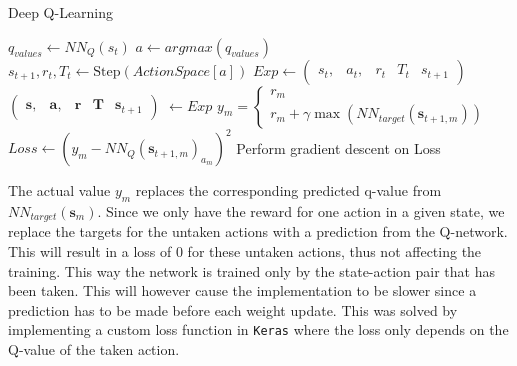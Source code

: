 \documentclass{LTHtwocol} %
\begin{document}
\begin{algorithm}[H]
	\label{alg:deep_q_training}
	\caption{Deep Q-Learning}
	\begin{algorithmic}
			 
				\State $q_{values} \gets NN_Q(s_t)$  %
				\State $a \gets argmax(q_{values})$ 	 
				\State $s_{t+1}, r_t, T_t \gets \text{Step}(ActionSpace[a])$ %
				\State $Exp \gets \begin{pmatrix} s_t, & a_t, & r_t & T_t & s_{t+1} \end{pmatrix}$
				\State $\begin{pmatrix} \mathbf{s}, & \mathbf{a}, & \mathbf{r} & \mathbf{T} & \mathbf{s}_{t+1} \end{pmatrix}$ $\gets Exp$  
				\State $y_m = \begin{cases} r_m \\ r_m + \gamma \max ( NN_{target}(\mathbf{s}_{t+1, m}) ) \end{cases}$
				\State  $Loss \gets (y_m - NN_Q(\mathbf{s}_{t+1,m})_{a_m})^2$
				\State Perform gradient descent on Loss
			\EndWhile
		\EndFor
	\end{algorithmic}
\end{algorithm}
The actual value $y_m$ replaces the corresponding predicted q-value from $NN_{target}(\mathbf{s}_m)$.
 Since we only have the reward for one action in a given state, we replace the targets for the untaken actions with a prediction from the Q-network. This will result in a loss of 0 for these untaken actions, thus not affecting the training.
 This way the network is trained only by the state-action pair that has been taken.
 This will however cause the implementation to be slower since a prediction has to be made before each weight update.
 This was solved by implementing a custom loss function in \texttt{Keras} where the loss only depends on the Q-value of the taken action.

\end{document}
